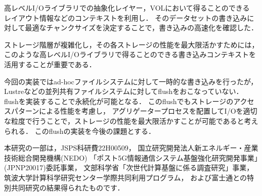 \documentclass[submit,techrep,noauthor]{ipsj}
\begin{document}
高レベルI/Oライブラリでの抽象化レイヤー，VOLにおいて得ることのできる
レイアウト情報などのコンテキストを利用し．
そのデータセットの書き込みに対して最適なチャンクサイズを決定することで，書き込みの高速化を確認した．

ストレージ階層が複雑化し，その各ストレージの性能を最大限活かすためには，
このような高レベルI/Oライブラリで得ることのできる書き込みコンテキストを活用することが重要である．

今回の実装ではad-hocファイルシステムに対して一時的な書き込みを行ったが，Lustreなどの並列共有ファイルシステムに対してflushをおこなっていない．
flushを実装することで永続化が可能となる．
このflushでもストレージのアクセスパターンによる性能を考慮し，
アグリゲータープロセスを配置してI/Oを適切な粒度で行うことで，ストレージの性能を最大限活かすことが可能であると考えられる．
このflushの実装を今後の課題とする．

\begin{acknowledgment}
	本研究の一部は，JSPS科研費22H00509，
	国立研究開発法人新エネルギー・産業技術総合開発機構(NEDO)
	「ポスト5G情報通信システム基盤強化研究開発事業」(JPNP20017)委託事業，
	文部科学省「次世代計算基盤に係る調査研究」事業，
	筑波大学計算科学研究センター学際共同利用プログラム，
	および富士通との特別共同研究の結果得られたものです．
\end{acknowledgment}



\end{document}
